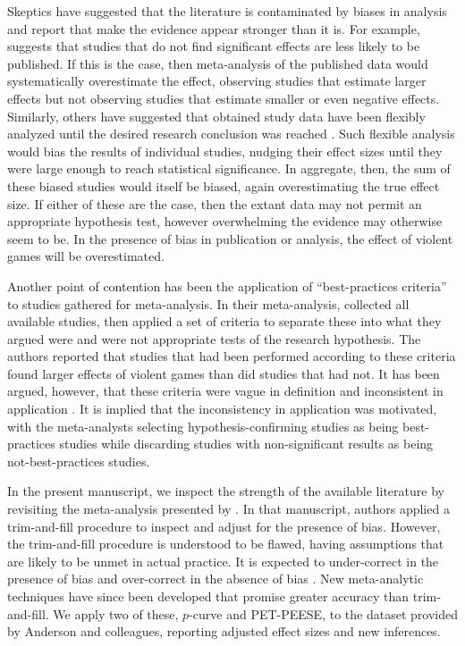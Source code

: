 \documentclass[man]{apa6}
\begin{document}
Skeptics have suggested that the literature is contaminated by biases in analysis and report that make the evidence appear stronger than it is. For example,  \citet{Ferguson:2007a} suggests that studies that do not find significant effects are less likely to be published. If this is the case, then meta-analysis of the published data would systematically overestimate the effect, observing studies that estimate larger effects but not observing studies that estimate smaller or even negative effects. 
Similarly, others have suggested that obtained study data have been flexibly analyzed until the desired research conclusion was reached \citep{Elson:etal:2014;Ferguson:CITATION:NEEDED}. Such flexible analysis would bias the results of individual studies, nudging their effect sizes until they were large enough to reach statistical significance. In aggregate, then, the sum of these biased studies would itself be biased, again overestimating the true effect size.
If either of these are the case, then the extant data may not permit an appropriate hypothesis test, however overwhelming the evidence may otherwise seem to be. In the presence of bias in publication or analysis, the effect of violent games will be overestimated.

Another point of contention has been the application of ``best-practices criteria'' to studies gathered for meta-analysis. In their meta-analysis, \citet{Anderson:etal:2010} collected all available studies, then applied a set of criteria to separate these into what they argued were and were not appropriate tests of the research hypothesis. The authors reported that studies that had been performed according to these criteria found larger effects of violent games than did studies that had not. It has been argued, however, that these criteria were vague in definition and inconsistent in application \citep{Elson:Ferguson:2014,Ferguson:Kilburn:2010}. 
It is implied that the inconsistency in application was motivated, with the meta-analysts selecting hypothesis-confirming studies as being best-practices studies while discarding studies with non-significant results as being not-best-practices studies.

In the present manuscript, we inspect the strength of the available literature by revisiting the meta-analysis presented by \citet{Anderson:etal:2010}. In that manuscript, authors applied a trim-and-fill procedure \citep{Duval:Tweedie:2000} to inspect and adjust for the presence of bias. 
However, the trim-and-fill procedure is understood to be flawed, having assumptions that are likely to be unmet in actual practice. It is expected to under-correct in the presence of bias and over-correct in the absence of bias \citep{Peters:etal:2007,Simonsohn:DATACOLADAPOST}.
New meta-analytic techniques have since been developed that promise greater accuracy than trim-and-fill. We apply two of these, $p$-curve and PET-PEESE, to the dataset provided by Anderson and colleagues, reporting adjusted effect sizes and new inferences.
\end{document}
